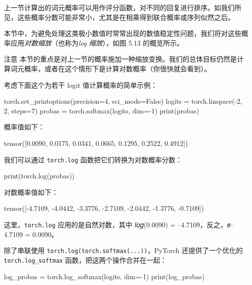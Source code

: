 上一节计算出的词元概率可以用作评分函数，对不同的回复进行排序。如我们所见，这些概率分数可能非常小，尤其是在相乘得到联合概率或序列似然之后。

本节中，为避免处理这类极小数值时常常出现的数值稳定性问题，我们将对这些概率应用\emph{对数缩放}（也称为\emph{log 缩放}），如图 5.13 的概览所示。


\begin{myWarning}{注意}
 本节的重点是对上一节的概率施加一种缩放变换。我们的总体目标仍然是计算词元概率，或者在这个情形下是计算对数概率（你很快就会看到）。\end{myWarning}

考虑下面这个为若干 logit 值计算概率的简单示例：

\begin{codebox}
torch.set_printoptions(precision=4, sci_mode=False)
logits = torch.linspace(-2, 2, steps=7)
probas = torch.softmax(logits, dim=-1)
print(probas)
\end{codebox}

概率值如下：

\begin{codebox}
tensor([0.0090, 0.0175, 0.0341, 0.0665, 0.1295, 0.2522, 0.4912])
\end{codebox}

我们可以通过 \texttt{torch.log} 函数把它们转换为对数概率分数：

\begin{codebox}
print(torch.log(probas))
\end{codebox}

对数概率值如下：

\begin{codebox}
tensor([-4.7109, -4.0442, -3.3776, -2.7109, -2.0442, -1.3776, -0.7109])
\end{codebox}

这里，\texttt{torch.log} 应用的是自然对数，其中 𝑙𝑜𝑔(0.0090) = –4.7109，反之，𝑒–4.7109 = 0.0090。

除了串联使用 \texttt{torch.log(torch.softmax(...))}，PyTorch 还提供了一个优化的 \texttt{torch.log\_softmax} 函数，把这两个操作合并在一起：

\begin{codebox}
log_probas = torch.log_softmax(logits, dim=-1)
print(log_probas)
\end{codebox}

